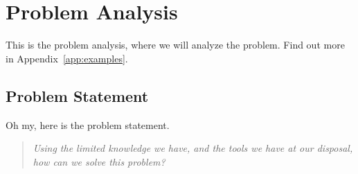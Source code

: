 \chapter{Problem Analysis}

This is the problem analysis, where we will analyze the problem. \cite{example}
Find out more in Appendix~\ref{app:examples}.

\section{Problem Statement}

Oh my, here is the problem statement.

\begin{quote}
    \textit{Using the limited knowledge we have, and the tools we have at our disposal, how can we solve this problem?}
\end{quote}
